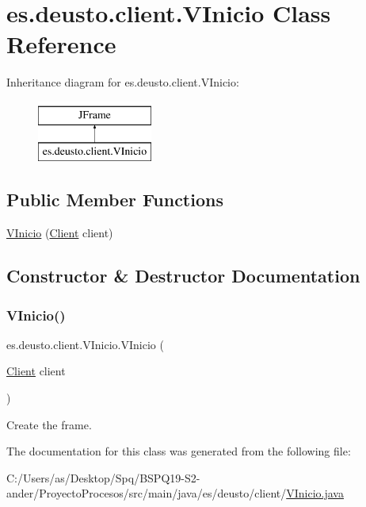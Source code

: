 \hypertarget{classes_1_1deusto_1_1client_1_1_v_inicio}{}\section{es.\+deusto.\+client.\+V\+Inicio Class Reference}
\label{classes_1_1deusto_1_1client_1_1_v_inicio}
Inheritance diagram for es.\+deusto.\+client.\+V\+Inicio\+:\begin{figure}[H]
\begin{center}
\leavevmode
\includegraphics[height=2.000000cm]{classes_1_1deusto_1_1client_1_1_v_inicio}
\end{center}
\end{figure}
\subsection*{Public Member Functions}
\begin{DoxyCompactItemize}
\item 
\mbox{\hyperlink{classes_1_1deusto_1_1client_1_1_v_inicio_afdd2ccc8ad54910cb71c90cd1e546bb7}{V\+Inicio}} (\mbox{\hyperlink{classes_1_1deusto_1_1client_1_1_client}{Client}} client)
\end{DoxyCompactItemize}


\subsection{Constructor \& Destructor Documentation}
\mbox{\label{classes_1_1deusto_1_1client_1_1_v_inicio_afdd2ccc8ad54910cb71c90cd1e546bb7}} 
\subsubsection{\texorpdfstring{VInicio()}{VInicio()}}
{\footnotesize\ttfamily es.\+deusto.\+client.\+V\+Inicio.\+V\+Inicio (\begin{DoxyParamCaption}\item[{\mbox{\hyperlink{classes_1_1deusto_1_1client_1_1_client}{Client}}}]{client }\end{DoxyParamCaption})}

Create the frame. 

The documentation for this class was generated from the following file\+:\begin{DoxyCompactItemize}
\item 
C\+:/\+Users/as/\+Desktop/\+Spq/\+B\+S\+P\+Q19-\/\+S2-\/ander/\+Proyecto\+Procesos/src/main/java/es/deusto/client/\mbox{\hyperlink{_v_inicio_8java}{V\+Inicio.\+java}}\end{DoxyCompactItemize}
